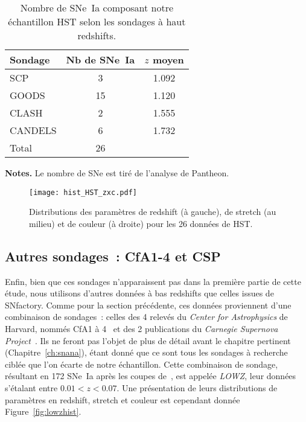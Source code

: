 \documentclass[../main/main.tex]{subfiles}
\begin{document}
\begin{table}[]
    \centering
    \begin{threeparttable}
        \caption{Nombre de SNe~Ia composant notre échantillon HST selon les
        sondages à haut redshifts.}
        \label{tab:hstcuts}
        \begin{tabular}{lcc}
            \toprule\toprule
            Sondage & Nb de SNe~Ia & $z$ moyen \\
            \midrule
            SCP     & 3            & 1.092 \\
            GOODS   & 15           & 1.120 \\
            CLASH   & 2            & 1.555\\
            CANDELS & 6            & 1.732 \\
            \midrule
            Total   & 26           & \\
            \bottomrule
        \end{tabular}
        \begin{tablenotes}[flushleft]
        \item \textbf{\hspace{-3.2pt}Notes.} Le nombre de SNe est tiré de
            l'analyse de Pantheon.
        \end{tablenotes}
    \end{threeparttable}
\end{table}

\begin{figure}[]
    \centering
    \texttt{[image: hist\_HST\_zxc.pdf]}
    \captionsetup{justification=centering}
    \caption{Distributions des paramètres de redshift (à gauche), de stretch (au
    milieu) et de couleur (à droite) pour les 26 données de HST.}
    \label{fig:hsthist}
\end{figure}

\subsection{Autres sondages~: CfA1-4 et CSP}\label{ssec:lowz}

Enfin, bien que ces sondages n'apparaissent pas dans la première partie de cette
étude, nous utilisons d'autres données à bas redshifts que celles issues de
SNfactory. Comme pour la section précédente, ces données proviennent d'une
combinaison de sondages~: celles des 4 relevés du \textit{Center for
Astrophysics} de Harvard, nommés CfA1 à 4~\citep{riess1999, jha2006,
hicken2009a, hicken2009b, hicken2012} et des 2 publications du \textit{Carnegie
Supernova Project}~\citep[CSP,][]{contreras2010, folatelli2010,
stritzinger2011}. Ils ne feront pas l'objet de plus de détail avant le chapitre
pertinent (Chapitre~\ref{ch:snana}), étant donné que ce sont tous les sondages à
recherche ciblée que l'on écarte de notre échantillon. Cette combinaison de
sondage, résultant en 172 SNe~Ia après les coupes de~\cite{scolnic2018}, est
appelée \textit{LOWZ}, leur données s'étalant entre $0.01 < z < 0.07$. Une
présentation de leurs distributions de paramètres en redshift, stretch et
couleur est cependant donnée Figure~\ref{fig:lowzhist}.
\end{document}
